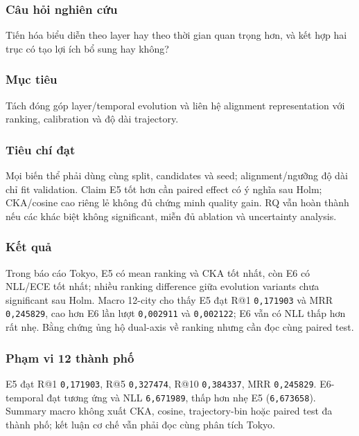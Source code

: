 \subsubsection*{Câu hỏi nghiên cứu}

Tiến hóa biểu diễn theo layer hay theo thời gian quan trọng hơn, và kết hợp hai trục có tạo lợi ích bổ sung hay không?

\subsubsection*{Mục tiêu}

Tách đóng góp layer/temporal evolution và liên hệ alignment representation với ranking, calibration và độ dài trajectory.

\subsubsection*{Tiêu chí đạt}

Mọi biến thể phải dùng cùng split, candidates và seed; alignment/ngưỡng độ dài chỉ fit validation. Claim E5 tốt hơn cần paired effect có ý nghĩa sau Holm; CKA/cosine cao riêng lẻ không đủ chứng minh quality gain. RQ vẫn hoàn thành nếu các khác biệt không significant, miễn đủ ablation và uncertainty analysis.

\subsubsection*{Kết quả}

Trong báo cáo Tokyo, E5 có mean ranking và CKA tốt nhất, còn E6 có NLL/ECE tốt nhất; nhiều ranking difference giữa evolution variants chưa significant sau Holm. Macro 12-city cho thấy E5 đạt R@1 \texttt{0,171903} và MRR \texttt{0,245829}, cao hơn E6 lần lượt \texttt{0,002911} và \texttt{0,002122}; E6 vẫn có NLL thấp hơn rất nhẹ. Bằng chứng ủng hộ dual-axis về ranking nhưng cần đọc cùng paired test.

\subsubsection*{Phạm vi 12 thành phố}

E5 đạt R@1 \texttt{0,171903}, R@5 \texttt{0,327474}, R@10 \texttt{0,384337}, MRR \texttt{0,245829}. E6-temporal đạt tương ứng  và NLL \texttt{6,671989}, thấp hơn nhẹ E5 (\texttt{6,673658}). Summary macro không xuất CKA, cosine, trajectory-bin hoặc paired test đa thành phố; kết luận cơ chế vẫn phải đọc cùng phân tích Tokyo.


